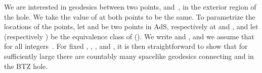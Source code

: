 \documentclass[a4paper,12pt]{article}
\begin{document}
We are interested in geodesics between two points, \coordHE{} and~\coordHE{}, 
in the exterior region of the hole. 
We take the value of \coordHE{} at both points to be the 
same. To parametrize the locations of the points, let \coordHE{} and \coordHE{}
be two points in AdS\coordHE{}, respectively at 
\coordHE{} and 
\coordHE{}, 
and let \coordHE{} (respectively \coordHE{}) be the
equivalence class of 
\coordHE{} (\coordHE{}). 
We write 
\coordHE{} and 
\coordHE{}, and we assume that 
\coordHE{} for all
integers~\coordHE{}. 
For fixed 
\coordHE{}, \coordHE{},
\coordHE{}, and \coordHE{}, it is then straightforward to show that for
sufficiently large \coordHE{} there 
are countably many spacelike geodesics connecting 
\coordHE{} and \coordHE{} in the BTZ hole. 
\end{document}
